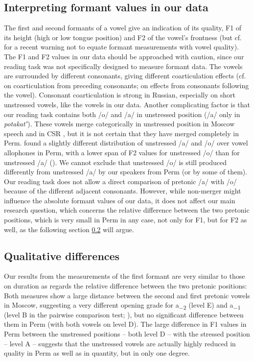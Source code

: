 \documentclass[output=paper,colorlinks,citecolor=black]{langscibook}
\begin{document}
\subsection{Interpreting formant values in our data}\label{post:subsec:interpreting}

The first and second formants of a vowel give an indication of its quality, F1 of its height (high or low tongue position) and F2 of the vowel’s frontness (but cf. \citealt{WhalenEtAl2022} for a recent warning not to equate formant measurements with vowel quality). The F1 and F2 values in our data should be approached with caution, since our reading task was not specifically designed to measure formant data. The vowels are surrounded by different consonants, giving different coarticulation effects (cf. \citealt[65]{Bondarko1977} on coarticulation from preceding consonants; \citealt{Kasatkina2005} on effects from consonants following the vowel). Consonant coarticulation is strong in Russian, especially on short unstressed vowels, like the vowels in our data. Another complicating factor is that our reading task contains both /o/ and /a/ in unstressed position (/a/ only in \textit{potakatʼ}). These vowels merge categorically in unstressed position in Moscow speech and in CSR \citep{Barnes2006}, but it is not certain that they have merged completely in Perm. \citet{Erofeeva2005} found a slightly different distribution of unstressed /a/ and /o/ over vowel allophones in Perm, with a lower span of F2 values for unstressed \mbox{/o/} than for unstressed /a/ (\citeyear[220]{Kasatkina2005}). We cannot exclude that unstressed /o/ is still produced differently from unstressed /a/ by our speakers from Perm (or by some of them). Our reading task does not allow a direct comparison of pretonic /a/ with /o/ because of the different adjacent consonants. However, while non-merger might influence the absolute formant values of our data, it does not affect our main research question, which concerns the relative difference between the two pretonic positions, which is very small in Perm in any case, not only for F1, but for F2 as well, as the following section \ref{post:subsec:qualitative} will argue.

\subsection{Qualitative differences}
\label{post:subsec:qualitative}

Our results from the measurements of the first formant are very similar to those on duration as regards the relative difference between the two pretonic positions: Both measures show a large distance between the second and first pretonic vowels in Moscow, suggesting a very different opening grade for a\textsubscript{\tiny{$-2$}} (level E) and a\textsubscript{\tiny{$-1$}} (level B in the pairwise comparison test; ), but no significant difference between them in Perm (with both vowels on level D). The large difference in F1 values in Perm between the unstressed positions -- both level D -- with the stressed position -- level A -- suggests that the unstressed vowels are actually highly reduced in quality in Perm as well as in quantity, but in only one degree.
\end{document}
